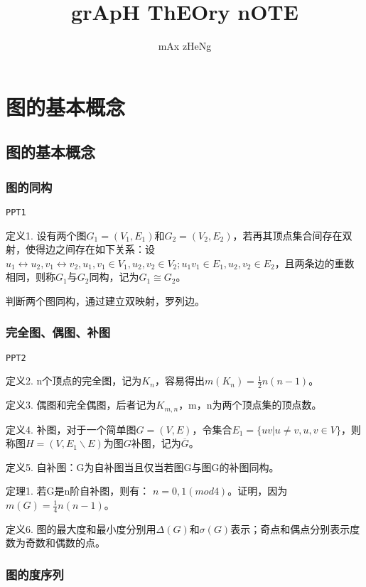 \documentclass{article}
\title{grApH ThEOry nOTE}
\author{mAx zHeNg}
\begin{document}
\maketitle

\tableofcontents

\section{图的基本概念}

\subsection{图的基本概念}

\subsubsection{图的同构}

\texttt{PPT1}

定义1. 设有两个图$G_1 = (V_1,E_1)$和$G_2 = (V_2,E_2)$，若再其顶点集合间存在双射，使得边之间存在如下关系：设$u_1 \leftrightarrow u_2, v_1 \leftrightarrow v_2, u_1,v_1 \in V_1, u_2,v_2 \in V_2; u_1v_1 \in E_1, u_2, v_2 \in E_2$，且两条边的重数相同，则称$G_1$与$G_2$同构，记为$G_1 \cong G_2$。

判断两个图同构，通过建立双映射，罗列边。

\subsubsection{完全图、偶图、补图}

\texttt{PPT2}

定义2. n个顶点的完全图，记为$K_n$，容易得出$m(K_n) = \frac12 n(n-1)$。

定义3. 偶图和完全偶图，后者记为$K_{m,n}$，m，n为两个顶点集的顶点数。

定义4. 补图，对于一个简单图$G = (V,E)$，令集合$E_1 = \{ uv|u \ne v, u,v \in V\} $，则称图$H = (V,E_1 \backslash E)$为图$G$补图，记为$\overline{G}$。

定义5. 自补图：G为自补图当且仅当若图G与图G的补图同构。

定理1. 若G是n阶自补图，则有： $n = 0,1(mod 4)$。证明，因为$m(G) = \frac14n(n-1)$。

定义6. 图的最大度和最小度分别用$\Delta(G) 和 \sigma(G)$表示；奇点和偶点分别表示度数为奇数和偶数的点。

\subsubsection{图的度序列}
\end{document}
